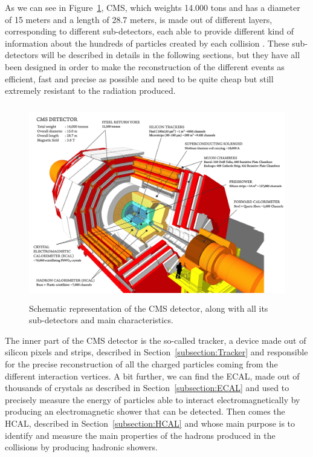 \documentclass[a4paper, 10pt, openright]{report}
\begin{document}
As we can see in Figure~\ref{fig:CMS}, \ac{CMS}, which weights 14.000 tons and has a diameter of 15 meters and a length of 28.7 meters, is made out of different layers, corresponding to different sub-detectors, each able to provide different kind of information about the hundreds of particles created by each collision \cite{CMSDescription}. These sub-detectors will be described in details in the following sections, but they have all been designed in order to make the reconstruction of the different events as efficient, fast and precise as possible and need to be quite cheap but still extremely resistant to the radiation produced.

\begin{figure}[htbp]
\begin{center}
\includegraphics[width=12cm, height=8.5cm]{figs/CMS.png}
\caption{Schematic representation of the \ac{CMS} detector, along with all its sub-detectors and main characteristics.}
\label{fig:CMS}
\end{center}
\end{figure}

The inner part of the \ac{CMS} detector is the so-called tracker, a device made out of silicon pixels and strips, described in Section~\ref{subsection:Tracker} and responsible for the precise reconstruction of all the charged particles coming from the different interaction vertices. A bit further, we can find the \acf{ECAL}, made out of thousands of crystals as described in Section~\ref{subsection:ECAL} and used to precisely measure the energy of particles able to interact electromagnetically by producing an electromagnetic shower that can be detected. Then comes the \acf{HCAL}, described in Section~\ref{subsection:HCAL} and whose main purpose is to identify and measure the main properties of the hadrons produced in the collisions by producing hadronic showers.
\end{document}
